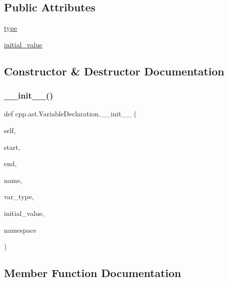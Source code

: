 \subsection*{Public Attributes}
\begin{DoxyCompactItemize}
\item 
\hyperlink{classcpp_1_1ast_1_1_variable_declaration_a8c7cc8578ea12f93c6e1c5c6ef4ddf99}{type}
\item 
\hyperlink{classcpp_1_1ast_1_1_variable_declaration_a7c259ca42a06e264679e8ab66e7ea374}{initial\+\_\+value}
\end{DoxyCompactItemize}


\subsection{Constructor \& Destructor Documentation}
\mbox{\label{classcpp_1_1ast_1_1_variable_declaration_adc19909b6a3b2c2978b02044634fc13f}} 
\subsubsection{\texorpdfstring{\+\_\+\+\_\+init\+\_\+\+\_\+()}{\_\_init\_\_()}}
{\footnotesize\ttfamily def cpp.\+ast.\+Variable\+Declaration.\+\_\+\+\_\+init\+\_\+\+\_\+ (\begin{DoxyParamCaption}\item[{}]{self,  }\item[{}]{start,  }\item[{}]{end,  }\item[{}]{name,  }\item[{}]{var\+\_\+type,  }\item[{}]{initial\+\_\+value,  }\item[{}]{namespace }\end{DoxyParamCaption})}



\subsection{Member Function Documentation}
\mbox{\label{classcpp_1_1ast_1_1_variable_declaration_a9f5c15731d1bdd8fe14c2a575e2f4fe6}} 
